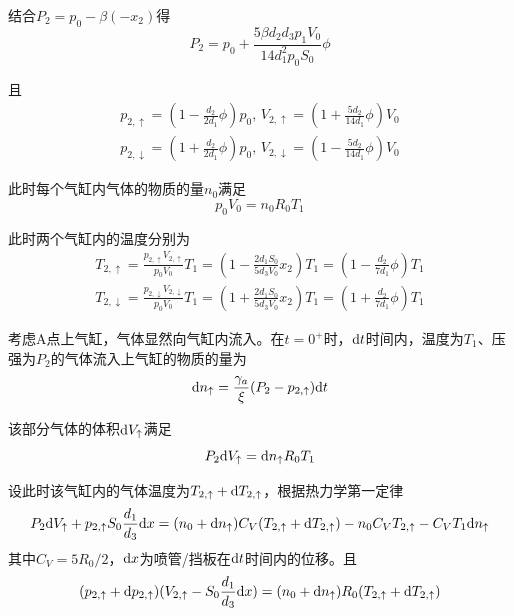\documentclass[10pt,a4paper,onecolumn,UTF8]{ctexart}
\begin{document}
	结合$P_2=p_0-\beta (-x_2)$得
	\begin{equation}\label{E6-06}
		P_2=p_0+\frac{5\beta d_2d_3p_1V_0}{14d_1^2p_0S_0}\phi
	\end{equation}
	
	且
	\begin{equation}\label{E6-07}
		\begin{aligned}
			p_{2,\uparrow}=\left(1-\frac{d_2}{2d_1}\phi\right)p_0,\,V_{2,\uparrow}=\left(1+\frac{5d_2}{14d_1}\phi\right)V_0\\p_{2,\downarrow}=\left(1+\frac{d_2}{2d_1}\phi\right)p_0,\,V_{2,\downarrow}=\left(1-\frac{5d_2}{14d_1}\phi\right)V_0
		\end{aligned}
	\end{equation}
	
	此时每个气缸内气体的物质的量$n_0$满足
	\begin{equation}\label{E6-08}
		p_0V_0=n_0R_0T_1
	\end{equation}
	
	此时两个气缸内的温度分别为
	\begin{equation}\label{E6-09}
		\begin{aligned}
			T_{2,\uparrow}=\frac{p_{2,\uparrow}V_{2,\uparrow}}{p_0V_0}T_1=\left(1-\frac{2d_1S_0}{5d_3V_0}x_2\right)T_1=\left(1-\frac{d_2}{7d_1}\phi\right)T_1\\
			T_{2,\downarrow}=\frac{p_{2,\downarrow}V_{2,\downarrow}}{p_0V_0}T_1=\left(1+\frac{2d_1S_0}{5d_3V_0}x_2\right)T_1=\left(1+\frac{d_2}{7d_1}\phi\right)T_1
		\end{aligned}
	\end{equation}
	
	考虑A点上气缸，气体显然向气缸内流入。在$t=0^+$时，$\mathrm{d} t$时间内，温度为$T_1$、压强为$P_2$的气体流入上气缸的物质的量为
	\begin{equation}\label{E6-10}
		\mathrm{d} n_{\uparrow}=\frac{\gamma_a}{\xi}(P_2-p_{2,\uparrow})\mathrm{d} t
	\end{equation}
	
	该部分气体的体积$\mathrm{d} V_{\uparrow}$满足
	\begin{equation}\label{E6-11}
		P_2\mathrm{d} V_{\uparrow}=\mathrm{d} n_{\uparrow}R_0T_1
	\end{equation}
	
	设此时该气缸内的气体温度为$T_{2,\uparrow}+\mathrm{d} T_{2,\uparrow}$，根据热力学第一定律
	\begin{equation}\label{E6-12}
		P_2\mathrm{d} V_{\uparrow}+p_{2,\uparrow}S_0\frac{d_1}{d_3}\mathrm{d} x=(n_0+\mathrm{d} n_{\uparrow})C_V(T_{2,\uparrow}+\mathrm{d} T_{2,\uparrow})-n_0C_VT_{2,\uparrow}-C_VT_1\mathrm{d} n_{\uparrow}
	\end{equation}
	其中$C_V=5R_0/2$，$\mathrm{d} x$为喷管/挡板在$\mathrm{d} t$时间内的位移。且
	\begin{equation}\label{E6-13}
		(p_{2,\uparrow}+\mathrm{d} p_{2,\uparrow})(V_{2,\uparrow}-S_0\frac{d_1}{d_3}\mathrm{d} x)=(n_0+\mathrm{d} n_{\uparrow})R_0(T_{2,\uparrow}+\mathrm{d} T_{2,\uparrow})
	\end{equation}
	
\end{document}
